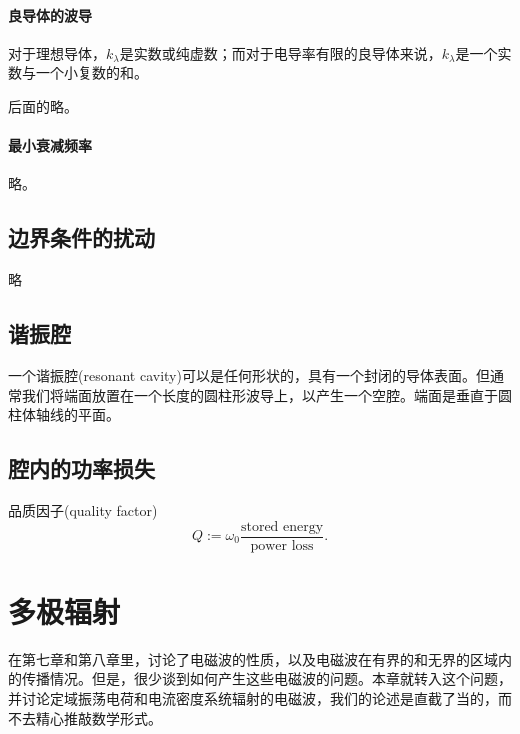 \paragraph{良导体的波导}
对于理想导体，$k_\lambda$是实数或纯虚数；而对于电导率有限的良导体来说，$k_\lambda$是一个实数与一个小复数的和。

后面的略。
\paragraph{最小衰减频率}
略。
\subsection{边界条件的扰动}
略
\subsection{谐振腔}
一个谐振腔(resonant cavity)可以是任何形状的，具有一个封闭的导体表面。但通常我们将端面放置在一个长度的圆柱形波导上，以产生一个空腔。端面是垂直于圆柱体轴线的平面。
\subsection{腔内的功率损失}
品质因子(quality factor)
\begin{equation}
    Q:=\omega_0\frac{\text{stored energy}}{\text{power loss}}.
\end{equation}
\clearpage
\section{多极辐射}
\label{sec:multipole radiation}
在第七章和第八章里，讨论了电磁波的性质，以及电磁波在有界的和无界的区域内的传播情况。但是，很少谈到如何产生这些电磁波的问题。本章就转入这个问题，并讨论定域振荡电荷和电流密度系统辐射的电磁波，我们的论述是直截了当的，而不去精心推敲数学形式。%

